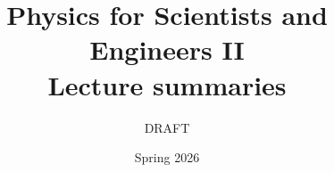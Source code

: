 \documentclass[10pt,twoside]{article}
\begin{document}
\title{Physics for Scientists and Engineers II \\
Lecture summaries}
\author{DRAFT}
\date{Spring 2026}
\maketitle
 
\begin{abstract}

\end{abstract}

\newpage
\tableofcontents
\cleardoublepage


\newpage


\newpage


\newpage


\newpage


\newpage


\newpage


\newpage


\newpage


\newpage


\newpage


\newpage


\newpage


\newpage


\newpage


\newpage


\newpage


\newpage


\newpage


\newpage


\newpage


\newpage


\newpage


\newpage


\newpage


\newpage


\end{document}
